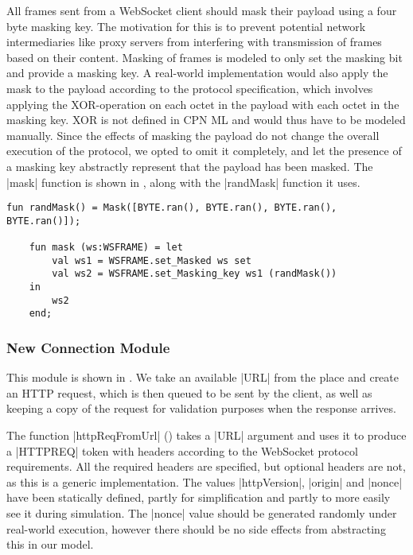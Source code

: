 	All frames sent from a WebSocket client should mask their payload using a four
	byte masking key.
	The motivation for this is to prevent potential network intermediaries like proxy
	servers from interfering with transmission of frames based on their content.
	Masking of frames is modeled to only set the masking bit and provide a
	masking key. A real-world implementation would also apply the mask to the
	payload according to the protocol specification, which involves applying the
	XOR-operation on each octet in the payload with each octet in the masking key.
	XOR is not defined in CPN ML and would thus have to be modeled manually. Since
	the effects of masking the payload do not change the overall execution of the
	protocol, we opted to omit it completely, and let the presence of a masking key
	abstractly represent that the payload has been masked. The |mask| function is
	shown in , along with the |randMask| function it uses.
	
	\begin{lstlisting}[label=lst:mask_fun,caption=Masking functions
	,gobble=1,float=h]
	fun randMask() = Mask([BYTE.ran(), BYTE.ran(), BYTE.ran(), BYTE.ran()]);
  
	fun mask (ws:WSFRAME) = let
		val ws1 = WSFRAME.set_Masked ws set
		val ws2 = WSFRAME.set_Masking_key ws1 (randMask())
	in 
		ws2
	end;
	\end{lstlisting}
     
	\subsubsection{New Connection Module}
		
		
		This module is shown in . We take an available |URL| from the
		 place and create an HTTP request, which is then
		queued to be sent by the client, as well as keeping a copy of the request for
		validation purposes when the response arrives.
		
		The function |httpReqFromUrl| () takes a |URL| argument
		and uses it to produce a |HTTPREQ| token with headers according to the WebSocket
		protocol requirements. 
		All the required headers are specified, but optional headers are not, as this
		is a generic implementation. The values |httpVersion|, |origin| and |nonce|
		have been statically defined, partly for simplification and partly to more
		easily see it during simulation. The |nonce| value should be generated
		randomly under real-world execution, however there should be no side effects
		from abstracting this in our model.

